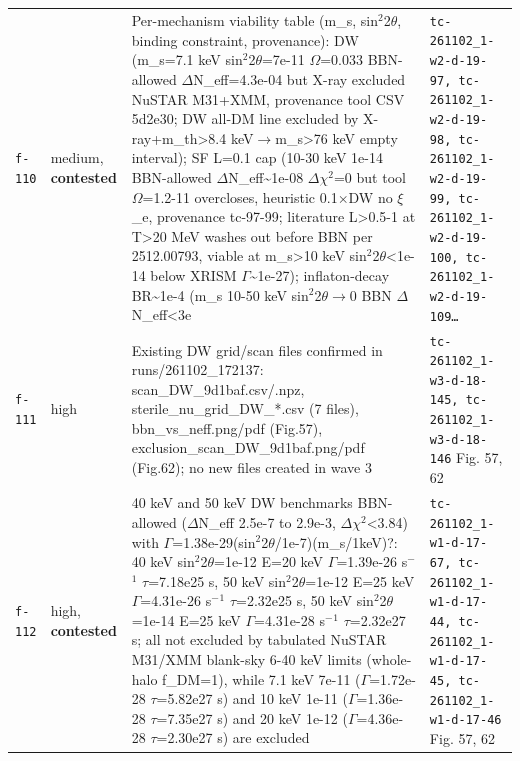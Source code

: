 \documentclass[11pt,a4paper]{article}
\begin{document}
\begin{longtable}{@{}p{}p{}p{}p{}@{}}
\texttt{f-110} & medium, \textbf{contested} & Per-mechanism viability table (m\_s, sin$^2$2$\theta$, binding constraint, provenance): DW (m\_s=7.1 keV sin$^2$2$\theta$=7e-11 $\Omega$=0.033 BBN-allowed $\Delta$N\_eff=4.3e-04 but X-ray excluded NuSTAR M31+XMM, provenance tool CSV 5d2e30; DW all-DM line excluded by X-ray+m\_th\textgreater{}8.4 keV$\to$m\_s\textgreater{}76 keV empty interval); SF L=0.1 cap (10-30 keV 1e-14 BBN-allowed $\Delta$N\_eff\textasciitilde{}1e-08 $\Delta$$\chi$$^2$=0 but tool $\Omega$=1.2-11 overcloses, heuristic 0.1$\times$DW no $\xi$\_e, provenance tc-97-99; literature L\textgreater{}0.5-1 at T\textgreater{}20 MeV washes out before BBN per 2512.00793, viable at m\_s\textgreater{}10 keV sin$^2$2$\theta$\textless{}1e-14 below XRISM $\Gamma$\textasciitilde{}1e-27); inflaton-decay BR\textasciitilde{}1e-4 (m\_s 10-50 keV sin$^2$2$\theta$$\to$0 BBN $\Delta$N\_eff\textless{}3e & \texttt{tc-261102\_\allowbreak{}1-w2-d-19-97,\allowbreak{} tc-261102\_\allowbreak{}1-w2-d-19-98,\allowbreak{} tc-261102\_\allowbreak{}1-w2-d-19-99,\allowbreak{} tc-261102\_\allowbreak{}1-w2-d-19-100,\allowbreak{} tc-261102\_\allowbreak{}1-w2-d-19-109\ldots{}\allowbreak{}} \\
\texttt{f-111} & high & Existing DW grid/scan files confirmed in runs/261102\_172137: scan\_DW\_9d1baf.csv/.npz, sterile\_nu\_grid\_DW\_*.csv (7 files), bbn\_vs\_neff.png/pdf (Fig.57), exclusion\_scan\_DW\_9d1baf.png/pdf (Fig.62); no new files created in wave 3 & \texttt{tc-261102\_\allowbreak{}1-w3-d-18-145,\allowbreak{} tc-261102\_\allowbreak{}1-w3-d-18-146} Fig. 57, 62 \\
\texttt{f-112} & high, \textbf{contested} & 40 keV and 50 keV DW benchmarks BBN-allowed ($\Delta$N\_eff 2.5e-7 to 2.9e-3, $\Delta$$\chi$$^2$\textless{}3.84) with $\Gamma$=1.38e-29(sin$^2$2$\theta$/1e-7)(m\_s/1keV)?: 40 keV sin$^2$2$\theta$=1e-12 E=20 keV $\Gamma$=1.39e-26 s$^-$$^1$ $\tau$=7.18e25 s, 50 keV sin$^2$2$\theta$=1e-12 E=25 keV $\Gamma$=4.31e-26 s$^-$$^1$ $\tau$=2.32e25 s, 50 keV sin$^2$2$\theta$=1e-14 E=25 keV $\Gamma$=4.31e-28 s$^-$$^1$ $\tau$=2.32e27 s; all not excluded by tabulated NuSTAR M31/XMM blank-sky 6-40 keV limits (whole-halo f\_DM=1), while 7.1 keV 7e-11 ($\Gamma$=1.72e-28 $\tau$=5.82e27 s) and 10 keV 1e-11 ($\Gamma$=1.36e-28 $\tau$=7.35e27 s) and 20 keV 1e-12 ($\Gamma$=4.36e-28 $\tau$=2.30e27 s) are excluded & \texttt{tc-261102\_\allowbreak{}1-w1-d-17-67,\allowbreak{} tc-261102\_\allowbreak{}1-w1-d-17-44,\allowbreak{} tc-261102\_\allowbreak{}1-w1-d-17-45,\allowbreak{} tc-261102\_\allowbreak{}1-w1-d-17-46} Fig. 57, 62 \\

\end{longtable}
\end{document}
